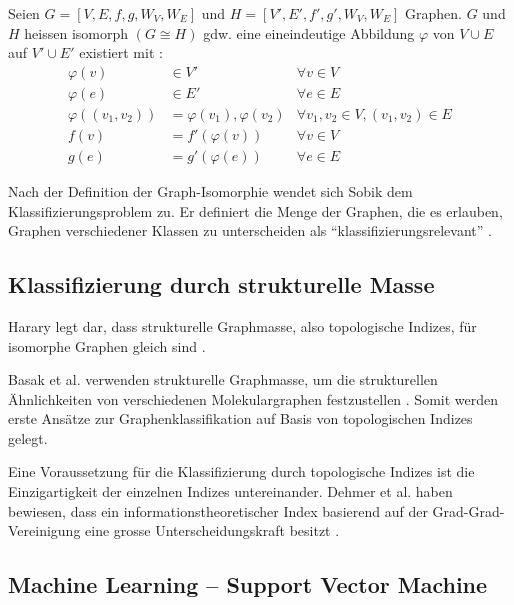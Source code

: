 Seien $G = [V, E, f, g, W_V, W_E] $ und $H = [V', E', f', g', W_V, W_E] $ Graphen. $G$ und $H$ heissen isomorph $(G \cong H)$ gdw. eine eineindeutige Abbildung $\varphi$ von $V \cup E$ auf $V' \cup E'$ existiert mit \cite[p.~65]{sobik1}:
\begin{align*}
    \varphi(v)          & \in V'                       & \forall v \in V                         \\
    \varphi(e)          & \in E'                       & \forall e \in E                         \\
    \varphi((v_1, v_2)) & = \varphi(v_1), \varphi(v_2) & \forall v_1,v_2 \in V, (v_1, v_2) \in E \\
    f(v)                & = f'(\varphi(v))             & \forall v \in V                         \\
    g(e)                & = g'(\varphi(e))             & \forall e \in E
\end{align*}

Nach der Definition der Graph-Isomorphie wendet sich Sobik dem Klassifizierungsproblem zu.
Er definiert die Menge der Graphen, die es erlauben, Graphen verschiedener Klassen zu unterscheiden als \enquote{klassifizierungsrelevant} \cite[p.~68]{sobik1}.

\subsection{Klassifizierung durch strukturelle Masse}

Harary legt dar, dass strukturelle Graphmasse, also topologische Indizes, für isomorphe Graphen gleich sind \cite{harary_graph_1994}.

Basak et al. verwenden strukturelle Graphmasse, um die strukturellen Ähnlichkeiten von verschiedenen Molekulargraphen festzustellen \cite{basak_topological_1987}.
Somit werden erste Ansätze zur Graphenklassifikation auf Basis von topologischen Indizes gelegt.

Eine Voraussetzung für die Klassifizierung durch topologische Indizes ist die Einzigartigkeit der einzelnen Indizes untereinander. Dehmer et al. haben bewiesen, dass ein informationstheoretischer Index basierend auf der Grad-Grad-Vereinigung eine grosse Unterscheidungskraft besitzt \cite{dehmer_information_2012}.

\subsection{Machine Learning – Support Vector Machine} \label{svm}

